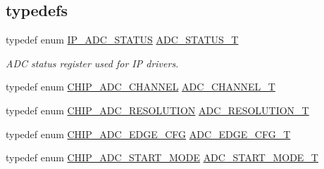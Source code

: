 \subsection*{\textquotesingle{}typedefs\textquotesingle{}}
\begin{DoxyCompactItemize}
\item 
typedef enum \hyperlink{group___a_d_c__18_x_x__43_x_x_ga4cdc8cd4b1ae4721ff5de44c783f310a}{I\+P\+\_\+\+A\+D\+C\+\_\+\+S\+T\+A\+T\+US} \hyperlink{group___a_d_c__18_x_x__43_x_x_ga5e2ef3f894759bbb12a9abf68518cbb7}{A\+D\+C\+\_\+\+S\+T\+A\+T\+U\+S\+\_\+T}
\begin{DoxyCompactList}\small\item\em A\+DC status register used for IP drivers. \end{DoxyCompactList}\item 
typedef enum \hyperlink{group___a_d_c__18_x_x__43_x_x_ga67b0a9ec8f34cf712b1f1c0119ba3d50}{C\+H\+I\+P\+\_\+\+A\+D\+C\+\_\+\+C\+H\+A\+N\+N\+EL} \hyperlink{group___a_d_c__18_x_x__43_x_x_ga30ee7058bc7cc1daff718b29b42bed4e}{A\+D\+C\+\_\+\+C\+H\+A\+N\+N\+E\+L\+\_\+T}
\item 
typedef enum \hyperlink{group___a_d_c__18_x_x__43_x_x_ga6da04ef4d158a6d61909481ed94df1a3}{C\+H\+I\+P\+\_\+\+A\+D\+C\+\_\+\+R\+E\+S\+O\+L\+U\+T\+I\+ON} \hyperlink{group___a_d_c__18_x_x__43_x_x_ga515c7ef9570ef08b29f55cd880e2e452}{A\+D\+C\+\_\+\+R\+E\+S\+O\+L\+U\+T\+I\+O\+N\+\_\+T}
\item 
typedef enum \hyperlink{group___a_d_c__18_x_x__43_x_x_gaba28e4e0734cc41087bae0c96d5090a8}{C\+H\+I\+P\+\_\+\+A\+D\+C\+\_\+\+E\+D\+G\+E\+\_\+\+C\+FG} \hyperlink{group___a_d_c__18_x_x__43_x_x_ga18d12879b004e16af3b47467a2d81d56}{A\+D\+C\+\_\+\+E\+D\+G\+E\+\_\+\+C\+F\+G\+\_\+T}
\item 
typedef enum \hyperlink{group___a_d_c__18_x_x__43_x_x_ga125e3c848732e5fa6e064354f618f57c}{C\+H\+I\+P\+\_\+\+A\+D\+C\+\_\+\+S\+T\+A\+R\+T\+\_\+\+M\+O\+DE} \hyperlink{group___a_d_c__18_x_x__43_x_x_ga68aae5a89b4dabc910e457a00e57ea8c}{A\+D\+C\+\_\+\+S\+T\+A\+R\+T\+\_\+\+M\+O\+D\+E\+\_\+T}
\end{DoxyCompactItemize}

